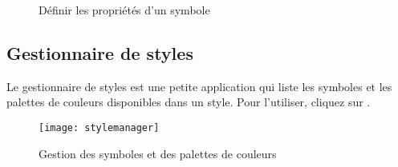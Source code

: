 \begin{figure}[ht]
\centering
   \hspace{1cm}
   \hspace{1cm}
\caption{Définir les propriétés d'un symbole \nixcaption}
\end{figure}

\subsection{Gestionnaire de styles}\label{subsec:stylemanager}

Le gestionnaire de styles est une petite application qui liste les symboles et les palettes de couleurs disponibles dans un style. Pour l'utiliser, cliquez sur  \arrow {}.

\begin{figure}[ht]
   \centering
   \texttt{[image: stylemanager]}
   \caption{Gestion des symboles et des palettes de couleurs \nixcaption}\label{fig:stylemanager}
\end{figure}

